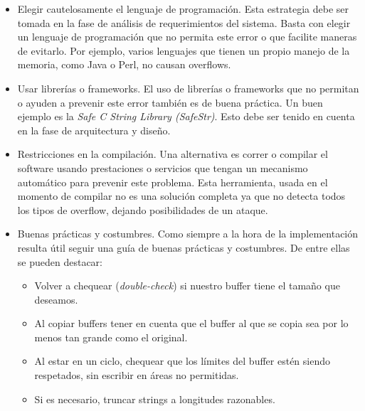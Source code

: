 \begin{itemize}
    \item Elegir cautelosamente el lenguaje de programación. Esta estrategia debe ser tomada en la fase de análisis de requerimientos del sistema.
	Basta con elegir un lenguaje de programación que no permita este error o que facilite maneras de evitarlo.
	Por ejemplo, varios lenguajes que tienen un propio manejo de la memoria, como Java o Perl, no causan overflows.
    \item Usar librerías o frameworks.
	El uso de librerías o frameworks que no permitan o ayuden a prevenir este error también es de buena práctica.
	Un buen ejemplo es la \textit{Safe C String Library (SafeStr)}.
	Esto debe ser tenido en cuenta en la fase de arquitectura y diseño.
    \item Restricciones en la compilación.
	Una alternativa es correr o compilar el software usando prestaciones o servicios que tengan un mecanismo automático para prevenir este problema.
	Esta herramienta, usada en el momento de compilar no es una solución completa ya que no detecta todos los tipos de overflow, dejando posibilidades de un ataque.
    \item Buenas prácticas y costumbres.
	Como siempre a la hora de la implementación resulta útil seguir una guía de buenas prácticas y costumbres.
	De entre ellas se pueden destacar:

        \begin{itemize}
            \item Volver a chequear (\textit{double-check}) si nuestro buffer tiene el tamaño que deseamos.

            \item Al copiar buffers tener en cuenta que el buffer al que se copia sea por lo menos tan grande como el original.

            \item Al estar en un ciclo, chequear que los límites del buffer estén siendo respetados, sin escribir en áreas no permitidas.

            \item Si es necesario, truncar strings a longitudes razonables.
        \end{itemize}


\end{itemize}
